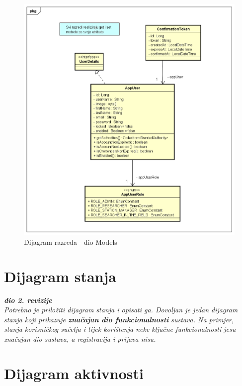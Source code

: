 			\begin{figure}[H]
				\includegraphics[scale=0.5]{dijagrami/Model.png} 
				\centering
				\caption{Dijagram razreda - dio Models}
				\label{fig:promjene}
			\end{figure}
			
			
			\eject
		
		\section{Dijagram stanja}
			
			
			\textbf{\textit{dio 2. revizije}}\\
			
			\textit{Potrebno je priložiti dijagram stanja i opisati ga. Dovoljan je jedan dijagram stanja koji prikazuje \textbf{značajan dio funkcionalnosti} sustava. Na primjer, stanja korisničkog sučelja i tijek korištenja neke ključne funkcionalnosti jesu značajan dio sustava, a registracija i prijava nisu. }
			
			
			\eject 
		
		\section{Dijagram aktivnosti}
			
